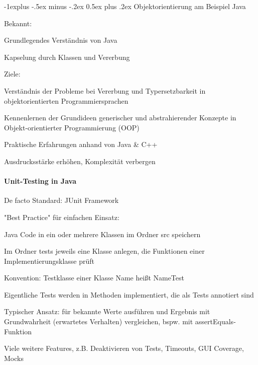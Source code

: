 \documentclass[10pt]{article}
\makeatletter
\renewcommand{\subsection}{\@startsection{subsection}{2}{0mm}%
                                {-1explus -.5ex minus -.2ex}%
                                {0.5ex plus .2ex}%
                                {\normalfont\normalsize\bfseries}}
\makeatother
\begin{document}
\subsection{Objektorientierung am Beispiel Java}
\begin{itemize*}
  \item Bekannt:
  \begin{itemize*}
    \item Grundlegendes Verständnis von Java
    \item Kapselung durch Klassen und Vererbung
  \end{itemize*}
  \item Ziele:
  \begin{itemize*}
    \item Verständnis der Probleme bei Vererbung und Typersetzbarkeit in objektorientierten Programmiersprachen
    \item Kennenlernen der Grundideen generischer und abstrahierender Konzepte in Objekt-orientierter Programmierung (OOP)
    \item Praktische Erfahrungen anhand von Java \& C++
  \end{itemize*}
  \item Ausdrucksstärke erhöhen, Komplexität verbergen
\end{itemize*}

\paragraph{Unit-Testing in Java}
\begin{itemize*}
  \item De facto Standard: JUnit Framework
  \item "Best Practice" für einfachen Einsatz:
  \begin{itemize*}
    \item Java Code in ein oder mehrere Klassen im Ordner src speichern
    \item Im Ordner tests jeweils eine Klasse anlegen, die Funktionen einer Implementierungsklasse prüft
    \item Konvention: Testklasse einer Klasse Name heißt NameTest
    \item Eigentliche Tests werden in Methoden implementiert, die als Tests annotiert sind
    \item Typischer Ansatz: für bekannte Werte ausführen und Ergebnis mit Grundwahrheit (erwartetes Verhalten) vergleichen, bspw. mit assertEquals-Funktion
  \end{itemize*}
  \item Viele weitere Features, z.B. Deaktivieren von Tests, Timeouts, GUI Coverage, Mocks
\end{itemize*}
\end{document}
